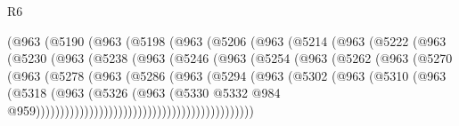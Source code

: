 \begin{lexlean}{R6}
\begin{coremodule}
                  (@963
                    (@5190
                      (@963
                        (@5198
                          (@963
                            (@5206
                              (@963
                                (@5214
                                  (@963
                                    (@5222
                                      (@963
                                        (@5230
                                          (@963
                                            (@5238
                                              (@963
                                                (@5246
                                                  (@963
                                                    (@5254
                                                      (@963
                                                        (@5262
                                                          (@963
                                                            (@5270
                                                              (@963
                                                                (@5278
                                                                  (@963
                                                                    (@5286
                                                                      (@963
                                                                        (@5294
                                                                          (@963
                                                                            (@5302
                                                                              (@963
                                                                                (@5310
                                                                                  (@963
                                                                                    (@5318
                                                                                      (@963
                                                                                        (@5326
                                                                                          (@963
                                                                                            (@5330
                                                                                              @5332
                                                                                              @984
                                                                                              @959)))))))))))))))))))))))))))))))))))))))))))))

\end{coremodule}
\end{lexlean}
